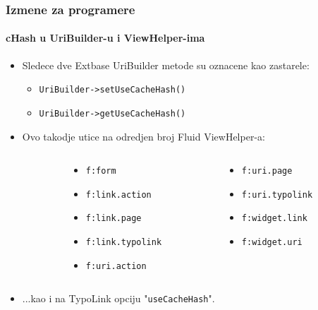 \begin{frame}[fragile]
	\frametitle{Izmene za programere}
	\framesubtitle{cHash u UriBuilder-u i ViewHelper-ima}

	\lstset{basicstyle=\smaller\ttfamily}

	\begin{itemize}
		\item Sledece dve Extbase UriBuilder metode su oznacene kao zastarele:

			\begin{itemize}
				\item \texttt{UriBuilder->setUseCacheHash()}
				\item \texttt{UriBuilder->getUseCacheHash()}
			\end{itemize}

		\item Ovo takodje utice na odredjen broj Fluid ViewHelper-a:
	\end{itemize}
	\vspace{-0.4cm}
	\begin{columns}[T]
		\begin{column}{.05\textwidth}
		\end{column}
		\begin{column}{.45\textwidth}
			\begin{itemize}\smaller
				\item \texttt{f:form}
				\item \texttt{f:link.action}
				\item \texttt{f:link.page}
				\item \texttt{f:link.typolink}
				\item \texttt{f:uri.action}
			\end{itemize}\normalsize
		\end{column}
		\begin{column}{.45\textwidth}
			\begin{itemize}\smaller
				\item \texttt{f:uri.page}
				\item \texttt{f:uri.typolink}
				\item \texttt{f:widget.link}
				\item \texttt{f:widget.uri}
			\end{itemize}\normalsize
		\end{column}
	\end{columns}
	\vspace{0.2cm}
	\begin{itemize}
		\item ...kao i na TypoLink opciju "\texttt{useCacheHash}".
	\end{itemize}

\end{frame}

